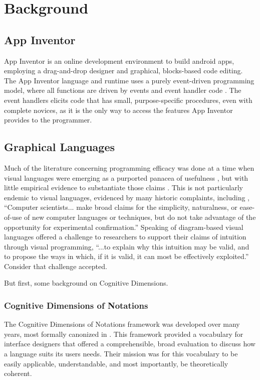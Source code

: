 \chapter{Background}
\label{chap:background}

\section{App Inventor}
\label{sec:app-inventor-background}
App Inventor is an online development environment to build android apps, employing a drag-and-drop designer and graphical, blocks-based code editing. The App Inventor language and runtime uses a purely event-driven programming model, where all functions are driven by events and event handler code \citep{turbak-2014}. The event handlers elicits code that has small, purpose-specific procedures, even with complete novices, as it is the only way to access the features App Inventor provides to the programmer.

\section{Graphical Languages}
\label{sec:graphical-languages}

Much of the literature concerning programming efficacy was done at a time when visual languages were emerging as a purported panacea of usefulness \citep{shu-1988}, but with little empirical evidence to substantiate those claims \citep{petre-1995}. This is not particularly endemic to visual languages, evidenced by many historic complaints, including \citet{sch-1980}, ``Computer scientists... make broad claims for the simplicity, naturalness, or ease-of-use of new computer languages or techniques, but do not take advantage of the opportunity for experimental confirmation.'' Speaking of diagram-based visual languages \citet{blackwell-2001} offered a challenge to researchers to support their claims of intuition through visual programming, ``...to explain why this intuition may be valid, and to propose the ways in which, if it is valid, it can most be effectively exploited.'' Consider that challenge accepted.

But first, some background on Cognitive Dimensions.

\subsection{Cognitive Dimensions of Notations}
The Cognitive Dimensions of Notations framework was developed over many years, most formally canonized in \citet{blackwell-2003}. This framework provided a vocabulary for interface designers that offered a comprehensible, broad evaluation to discuss how a language suits its users needs. Their mission was for this vocabulary to be easily applicable, understandable, and most importantly, be theoretically coherent. 

